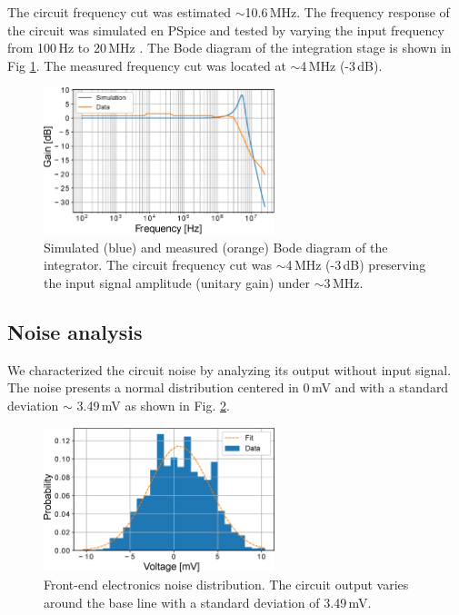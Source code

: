 \documentclass[letterpaper,12pt]{article}
\begin{document}
The circuit frequency cut was estimated $\sim$10.6\,MHz. The frequency response of the circuit was simulated en PSpice and tested by varying the input frequency from 100\,Hz to 20\,MHz \cite{salgado2020}. The Bode diagram of the integration stage is shown in Fig \ref{fig::bode}. The measured frequency cut was located at $\sim$4\,MHz (-3\,dB).

\begin{figure}[h!]
\begin{center}
\includegraphics[width=0.6\textwidth]{Figures/Integrador_Bode.eps}
\caption{Simulated (blue) and measured (orange) Bode diagram of the integrator. The circuit frequency cut was $\sim$4\,MHz (-3\,dB) preserving the input signal amplitude (unitary gain) under $\sim$3\,MHz.}
\label{fig::bode}
\end{center}
\end{figure}

\subsection{Noise analysis}

We characterized the circuit noise by analyzing its output without input signal. The noise presents a normal distribution centered in 0\,mV and with a standard deviation $\sim$ 3.49\,mV as shown in Fig. \ref{fig::intnoise}.


\begin{figure}[h!]
\begin{center}
\includegraphics[width=0.6\textwidth]{Figures/Ruido_Ana.eps}
\caption{Front-end electronics noise distribution. The circuit output varies around the base line with a standard deviation of 3.49\,mV.}
\label{fig::intnoise}
\end{center}
\end{figure}
\end{document}
